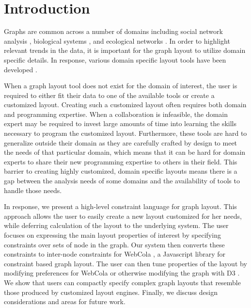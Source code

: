 \section{Introduction}
\alignedTree
Graphs are common across a number of domains including social network analysis \cite{scott1988social,travers1967small,granovetter1973strength,watts1998collective,freeman1978centrality}, biological systems \cite{barsky2008cerebral,shannon2003cytoscape,gehlenborg2010visualization,saraiya2005visualizing}, and ecological networks \cite{hinke2004visualizing,harper2006dynamic,lavigne1996cod,baskerville2011spatial,yodzis1998local,cohen2003ecological,kearney2016blog,benson2016higher}. In order to highlight relevant trends in the data, it is important for the graph layout to utilize domain specific details. In response, various domain specific layout tools have been developed \cite{barsky2008cerebral,shannon2003cytoscape,kearney2017d3,kearney2017ecopath,gawron2016pss}.

When a graph layout tool does not exist for the domain of interest, the user is required to either fit their data to one of the available tools or create a customized layout. Creating such a customized layout often requires both domain and programming expertise. When a collaboration is infeasible, the domain expert may be required to invest large amounts of time into learning the skills necessary to program the customized layout. Furthermore, these tools are hard to generalize outside their domain as they are carefully crafted by design to meet the needs of that particular domain, which means that it can be hard for domain experts to share their new programming expertise to others in their field. This barrier to creating highly customized, domain specific layouts means there is a gap between the analysis needs of some domains and the availability of tools to handle those needs.

In response, we present a high-level constraint language for graph layout. This approach allows the user to easily create a new layout customized for her needs, while deferring calculation of the layout to the underlying system. The user focuses on expressing the main layout properties of interest by specifying constraints over sets of node in the graph. Our system then converts these constraints to inter-node constraints for WebCola \cite{WebCoLa}, a Javascript library for constraint based graph layout. The user can then tune properties of the layout by modifying preferences for WebCola or otherwise modifying the graph with D3 \cite{bostock:d3}. We show that users can compactly specify complex graph layouts that resemble those produced by customized layout engines. Finally, we discuss design considerations and areas for future work.



%  
